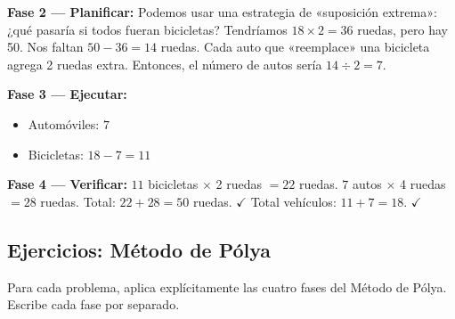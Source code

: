 \documentclass[12pt, a4paper]{article}
\begin{document}
\begin{cuadrosolucion}
\textbf{Fase 2 — Planificar:}
Podemos usar una estrategia de «suposición extrema»: ¿qué pasaría si todos fueran bicicletas? Tendríamos $18 \times 2 = 36$ ruedas, pero hay 50. Nos faltan $50 - 36 = 14$ ruedas. Cada auto que «reemplace» una bicicleta agrega 2 ruedas extra. Entonces, el número de autos sería $14 \div 2 = 7$.
\end{cuadrosolucion}

\begin{cuadrosolucion}
\textbf{Fase 3 — Ejecutar:}
\begin{itemize}
  \item Automóviles: $7$
  \item Bicicletas: $18 - 7 = 11$
\end{itemize}
\end{cuadrosolucion}

\begin{cuadrosolucion}
\textbf{Fase 4 — Verificar:}
$11$ bicicletas $\times$ 2 ruedas $= 22$ ruedas. $7$ autos $\times$ 4 ruedas $= 28$ ruedas. Total: $22 + 28 = 50$ ruedas. $\checkmark$ Total vehículos: $11 + 7 = 18$. $\checkmark$
\end{cuadrosolucion}

\newpage

\subsection{Ejercicios: Método de Pólya}
Para cada problema, aplica explícitamente las cuatro fases del Método de Pólya. Escribe cada fase por separado.
\end{document}

